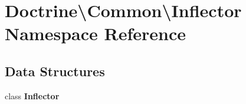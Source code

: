 \section{Doctrine\textbackslash{}Common\textbackslash{}Inflector Namespace Reference}
\label{namespace_doctrine_1_1_common_1_1_inflector}
\subsection*{Data Structures}
\begin{DoxyCompactItemize}
\item 
class {\bf Inflector}
\end{DoxyCompactItemize}

